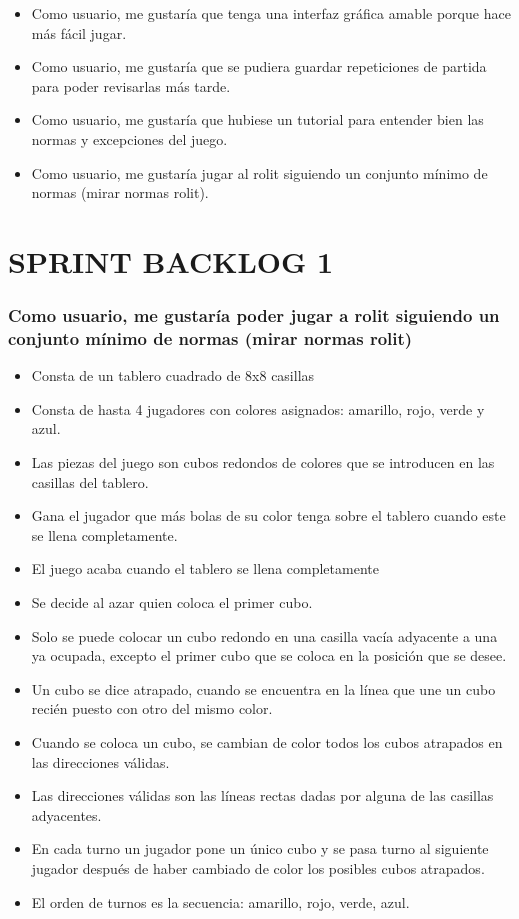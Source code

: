 \documentclass{article}
\begin{document}
\begin{itemize}
\item Como usuario, me gustaría que tenga una interfaz gráfica amable porque hace más fácil jugar.

\item Como usuario, me gustaría que se pudiera guardar repeticiones de partida para poder revisarlas más tarde.

\item Como usuario, me gustaría que hubiese un tutorial para entender bien las normas y excepciones del juego.

\item Como usuario, me gustaría jugar al rolit siguiendo un conjunto mínimo de normas (mirar normas rolit).
\end{itemize}

\section*{SPRINT BACKLOG 1}
\subsubsection*{Como usuario, me gustaría poder jugar a rolit siguiendo un conjunto mínimo de normas (mirar normas rolit)}
\begin{itemize}
\item Consta de un tablero cuadrado de 8x8 casillas
\item Consta de hasta 4 jugadores con colores asignados: amarillo, rojo, verde y azul.
\item Las piezas del juego son cubos redondos de colores que se introducen en las casillas del tablero.
\item Gana el jugador que más bolas de su color tenga sobre el tablero cuando este se llena completamente.
\item El juego acaba cuando el tablero se llena completamente
\item Se decide al azar quien coloca el primer cubo.
\item Solo se puede colocar un cubo redondo en una casilla vacía adyacente a una ya ocupada, excepto el primer cubo que se coloca en la posición que se desee.
\item Un cubo se dice atrapado, cuando se encuentra en la línea que une un cubo recién puesto con otro del mismo color.
\item Cuando se coloca un cubo, se cambian de color todos los cubos atrapados en las direcciones válidas.
\item Las direcciones válidas son las líneas rectas dadas por alguna de las casillas adyacentes.
\item En cada turno un jugador pone un único cubo y se pasa turno al siguiente jugador después de haber cambiado de color los posibles cubos atrapados.
\item El orden de turnos es la secuencia: amarillo, rojo, verde, azul.
\end{itemize}
\end{document}
